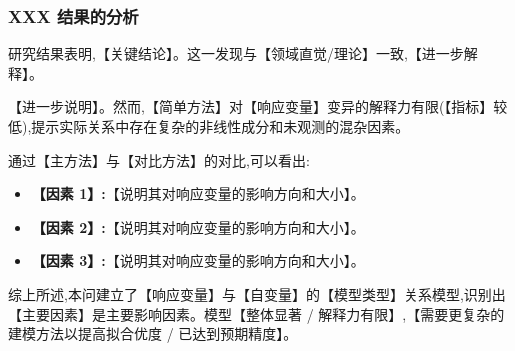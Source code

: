 
\subsubsection{XXX 结果的分析}


研究结果表明,【关键结论】。这一发现与【领域直觉/理论】一致,【进一步解释】。

【进一步说明】。然而,【简单方法】对【响应变量】变异的解释力有限(【指标】较低),提示实际关系中存在复杂的非线性成分和未观测的混杂因素。

通过【主方法】与【对比方法】的对比,可以看出:

\begin{itemize}[itemindent=2em]
  \item \textbf{【因素 1】:}【说明其对响应变量的影响方向和大小】。
  \item \textbf{【因素 2】:}【说明其对响应变量的影响方向和大小】。
  \item \textbf{【因素 3】:}【说明其对响应变量的影响方向和大小】。
\end{itemize}


综上所述,本问建立了【响应变量】与【自变量】的【模型类型】关系模型,识别出【主要因素】是主要影响因素。模型【整体显著 / 解释力有限】,【需要更复杂的建模方法以提高拟合优度 / 已达到预期精度】。
